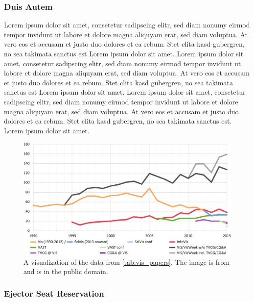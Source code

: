 \documentclass[journal]{vgtc}                %
\begin{document}
\subsubsection{Duis Autem}

Lorem ipsum dolor sit amet, consetetur sadipscing elitr, sed diam
nonumy eirmod tempor invidunt ut labore et dolore magna aliquyam erat,
sed diam voluptua. At vero eos et accusam et justo duo dolores et ea
rebum. Stet clita kasd gubergren, no sea takimata sanctus est Lorem
ipsum dolor sit amet. Lorem ipsum dolor sit amet, consetetur
sadipscing elitr, sed diam nonumy eirmod tempor invidunt ut labore et
dolore magna aliquyam erat, sed diam voluptua. At vero eos et accusam
et justo duo dolores et ea rebum. Stet clita kasd gubergren, no sea
takimata sanctus est Lorem ipsum dolor sit amet. Lorem ipsum dolor sit
amet, consetetur sadipscing elitr, sed diam nonumy eirmod tempor
invidunt ut labore et dolore magna aliquyam erat, sed diam
voluptua. At vero eos et accusam et justo duo dolores et ea
rebum. Stet clita kasd gubergren, no sea takimata sanctus est. Lorem
ipsum dolor sit amet.

\begin{figure}[tb]
 \centering %
 \includegraphics[width=\columnwidth]{paper-count-w-2015-new}
 \caption{A visualization of the data from \autoref{tab:vis_papers}. The image is from \cite{Isenberg:2017:VMC} and is in the public domain.}
 \label{fig:sample}
\end{figure}

\subsubsection{Ejector Seat Reservation}
\end{document}
